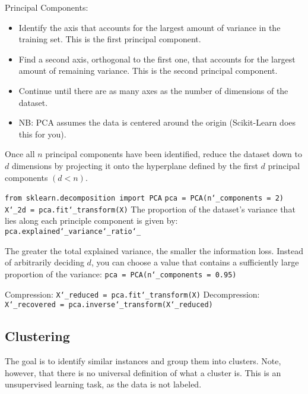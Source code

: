 Principal Components:
\vspace{-3.0mm}
\begin{itemize}
\item
Identify the axis that accounts for the largest amount of variance in the training set.
This is the first principal component.
\item
Find a second axis, orthogonal to the first one,
that accounts for the largest amount of remaining variance.
This is the second principal component.
\item
Continue until there are as many axes as the number of dimensions of the dataset.
\item
NB: PCA assumes the data is centered around the origin (Scikit-Learn does this for you).
\end{itemize}

\vspace{-3.0mm}
Once all $n$ principal components have been identified,
reduce the dataset down to $d$ dimensions
by projecting it onto the hyperplane defined by the first $d$ principal components $(d < n)$.

\texttt{from sklearn.decomposition import PCA}\newline
\texttt{pca = PCA(n\char`_components = 2)}\newline
\texttt{X\char`_2d = pca.fit\char`_transform(X)}\newline
The proportion of the dataset's variance that lies along each principle component is given by:\newline
\texttt{pca.explained\char`_variance\char`_ratio\char`_}

The greater the total explained variance,
the smaller the information loss.
Instead of arbitrarily deciding $d$,
you can choose a value that contains a sufficiently large proportion of the variance:\newline
\texttt{pca = PCA(n\char`_components = 0.95)}

Compression: \texttt{X\char`_reduced = pca.fit\char`_transform(X)}\newline
Decompression: \texttt{X\char`_recovered = pca.inverse\char`_transform(X\char`_reduced)}


\newpage
\subsection{Clustering}
The goal is to identify similar instances and group them into clusters.\newline
Note, however, that there is no universal definition of what a cluster is.\newline
This is an unsupervised learning task, as the data is not labeled.\newline

